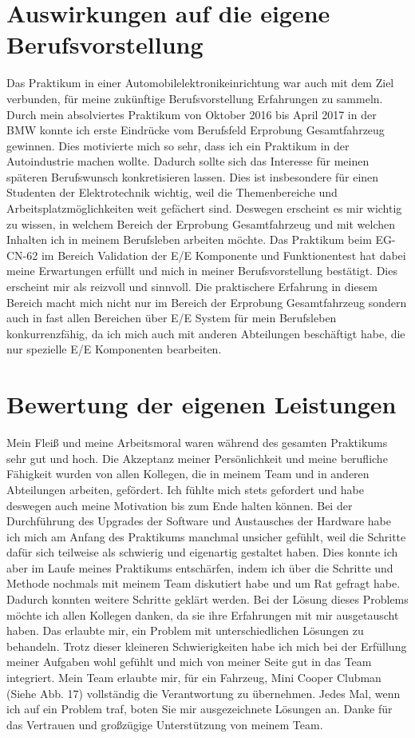 \documentclass[10pt,a4paper]{report}
\begin{document}
\section{Auswirkungen auf die eigene Berufsvorstellung}
Das Praktikum in einer Automobilelektronikeinrichtung war auch mit dem Ziel verbunden, für meine zukünftige Berufsvorstellung Erfahrungen zu sammeln. Durch mein absolviertes Praktikum von Oktober 2016 bis April 2017 in der BMW konnte ich erste Eindrücke vom Berufsfeld Erprobung Gesamtfahrzeug gewinnen. Dies motivierte mich so sehr, dass ich ein Praktikum in der Autoindustrie machen wollte. Dadurch sollte sich das Interesse für meinen späteren Berufswunsch konkretisieren lassen. Dies ist insbesondere für einen Studenten der Elektrotechnik wichtig, weil die Themenbereiche und Arbeitsplatzmöglichkeiten weit gefächert sind. Deswegen erscheint es mir wichtig zu wissen, in welchem Bereich der Erprobung Gesamtfahrzeug und mit welchen Inhalten ich in meinem Berufsleben arbeiten möchte.
Das Praktikum beim EG-CN-62 im Bereich Validation der E/E Komponente und Funktionentest hat dabei meine Erwartungen erfüllt und mich in meiner Berufsvorstellung bestätigt. Dies erscheint mir als reizvoll und sinnvoll. Die praktischere Erfahrung in diesem Bereich macht mich nicht nur im Bereich der Erprobung Gesamtfahrzeug sondern auch in fast allen Bereichen über E/E System für mein Berufsleben konkurrenzfähig, da ich mich auch mit anderen Abteilungen beschäftigt habe, die nur spezielle E/E Komponenten bearbeiten.


\section{Bewertung der eigenen Leistungen}
Mein Fleiß und meine Arbeitsmoral waren während des gesamten Praktikums sehr gut und hoch. Die Akzeptanz meiner Persönlichkeit und meine berufliche Fähigkeit wurden von allen Kollegen, die in meinem Team und in anderen Abteilungen arbeiten, gefördert. Ich fühlte mich stets gefordert und habe deswegen auch meine Motivation bis zum Ende halten können. Bei der Durchführung des Upgrades der Software und Austausches der Hardware habe ich mich am Anfang des Praktikums manchmal unsicher gefühlt, weil die Schritte dafür sich teilweise als schwierig und eigenartig gestaltet haben. Dies konnte ich aber im Laufe meines Praktikums entschärfen, indem ich über die Schritte und Methode nochmals mit meinem Team diskutiert habe und um Rat gefragt habe. Dadurch konnten weitere Schritte geklärt werden. Bei der Lösung dieses Problems möchte ich allen Kollegen danken, da sie ihre Erfahrungen mit mir ausgetauscht haben. Das erlaubte mir, ein Problem mit unterschiedlichen Lösungen zu behandeln. Trotz dieser kleineren Schwierigkeiten habe ich mich bei der Erfüllung meiner Aufgaben wohl gefühlt und mich von meiner Seite gut in das Team integriert. Mein Team erlaubte mir, für ein Fahrzeug, Mini Cooper Clubman (Siehe Abb. 17) vollständig die Verantwortung zu übernehmen. Jedes Mal, wenn ich auf ein Problem traf, boten Sie mir ausgezeichnete Lösungen an. Danke für das Vertrauen und großzügige Unterstützung von meinem Team. 
\end{document}
